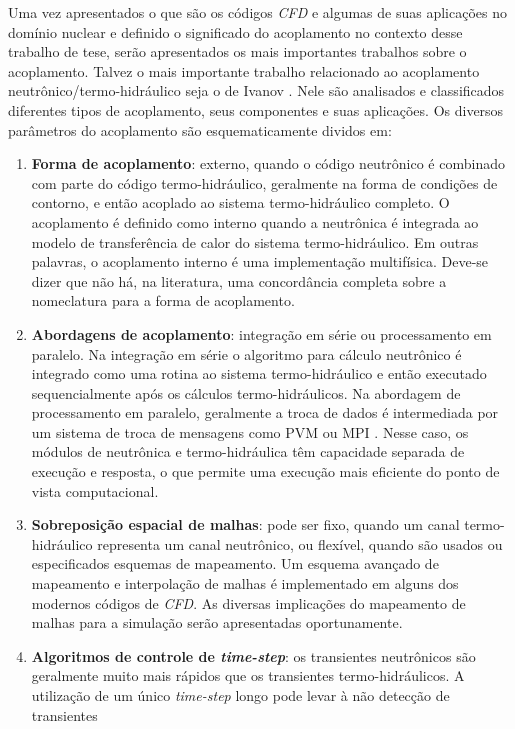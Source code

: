 Uma vez apresentados o que são os códigos \textit{CFD} e algumas de suas aplicações no domínio nuclear e definido o significado do acoplamento no contexto desse trabalho de tese, serão apresentados os mais importantes 
trabalhos sobre o acoplamento. Talvez o mais importante trabalho relacionado ao acoplamento 
neutrônico/termo-hidráulico seja o de Ivanov \cite{Ivanov2007}. Nele são analisados e classificados diferentes tipos de 
acoplamento, seus componentes e suas aplicações. Os diversos parâmetros do acoplamento são esquematicamente dividos em: 
\begin{enumerate}
\item \textbf{Forma de acoplamento}: externo, quando o código neutrônico é combinado com parte do código termo-hidráulico, 
geralmente na forma de condições de contorno, e então acoplado ao sistema termo-hidráulico completo. O acoplamento 
é definido como interno quando a neutrônica é integrada ao modelo de transferência de calor do sistema termo-hidráulico. 
Em outras palavras, o acoplamento interno é uma implementação multifísica. Deve-se dizer que não há, na literatura, uma
concordância completa sobre a nomeclatura para a forma de acoplamento. 
\item \textbf{Abordagens de acoplamento}: integração em série ou processamento em paralelo. Na integração em série o algoritmo 
para cálculo neutrônico é integrado como uma rotina ao sistema termo-hidráulico e então executado sequencialmente 
após os cálculos termo-hidráulicos. Na abordagem de processamento em paralelo, geralmente a troca de dados é 
intermediada por um sistema de troca de mensagens como PVM \cite{Geist94} ou MPI \cite{Quinn2004}. Nesse caso, os 
módulos de neutrônica e termo-hidráulica têm capacidade separada de execução e resposta, o que permite uma execução 
mais eficiente do ponto de vista computacional.
\item \textbf{Sobreposição espacial de malhas}: pode ser fixo, quando um canal termo-hidráulico representa um canal neutrônico, 
ou flexível, quando são usados ou especificados esquemas de mapeamento. Um esquema avançado de mapeamento 
e interpolação de malhas \cite{Beaudoin2008} é implementado em alguns dos modernos códigos de \textit{CFD}. As diversas implicações 
do mapeamento de malhas para a simulação serão apresentadas oportunamente.
\item \textbf{Algoritmos de controle de \textit{time-step}}: os transientes neutrônicos são geralmente muito mais rápidos que 
os transientes termo-hidráulicos. A utilização de um único \textit{time-step} longo pode levar à não detecção de transientes 

\end{enumerate}
